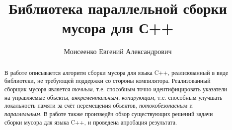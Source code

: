 \title{Библиотека параллельной сборки мусора для С++}


\author{Моисеенко Евгений Александрович}



\maketitle

\newcommand{\code}[1]{\textsf{#1}}

\begin{abstract}
В работе описывается алгоритм сборки мусора для языка C++, 
реализованный в виде библиотеки, не требующей поддержки со стороны компилятора. 
Реализованный сборщик мусора является 
\emph{точным}, т.е. способным точно идентифицировать указатели на управляемые объекты, 
\emph{инкрементальным}, 
\emph{копирующим}, т.е. способным улучшать локальность памяти за счёт перемещения объектов, 
\emph{потокобезопасным} и \emph{параллельным}. 
В работе также произведён обзор существующих решений задачи сборки мусора для языка C++, 
и проведена апробация результата.
\end{abstract}









